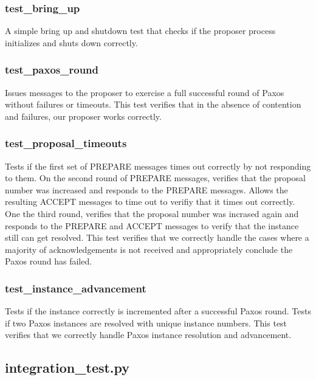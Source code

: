 \documentclass{article}
\begin{document}
\subsubsection{test\_bring\_up}

A simple bring up and shutdown test that checks if the proposer process initializes and shuts down correctly.

\subsubsection{test\_paxos\_round}

Issues messages to the proposer to exercise a full successful round of Paxos without failures or timeouts.
This test verifies that in the absence of contention and failures, our proposer works correctly.

\subsubsection{test\_proposal\_timeouts}

Tests if the first set of PREPARE messages times out correctly by not responding to them.
On the second round of PREPARE messages, verifies that the proposal number was increased and responds to the PREPARE messages.
Allows the resulting ACCEPT messages to time out to verifiy that it times out correctly.
One the third round, verifies that the proposal number was incrased again and responds to the PREPARE and ACCEPT messages to verify that the instance still can get resolved.
This test verifies that we correctly handle the cases where a majority of acknowledgements is not received and appropriately conclude the Paxos round has failed.

\subsubsection{test\_instance\_advancement}

Tests if the instance correctly is incremented after a successful Paxos round.
Tests if two Paxos instances are resolved with unique instance numbers.
This test verifies that we correctly handle Paxos instance resolution and advancement.

\subsection{integration\_test.py}
\end{document}
